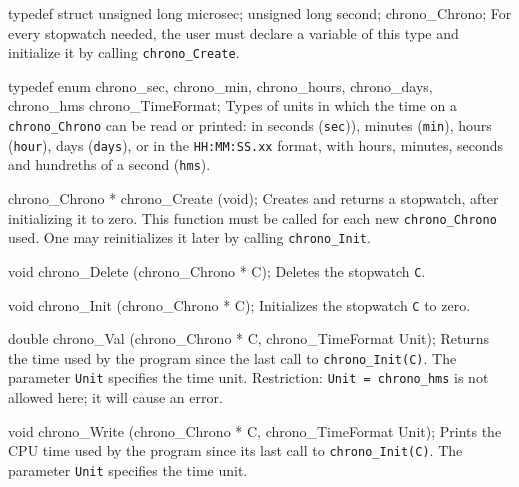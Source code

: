 \code
\iffalse
/* chrono.h for ANSI C */

#ifndef CHRONO_H
#define CHRONO_H 
#include "gdef.h"
\fi
\endcode

\newpage
\code

typedef struct {
   unsigned long microsec;
   unsigned long second;
   } chrono_Chrono;
\endcode
  \tab
   For every stopwatch needed, the user must declare a variable of
   this type and initialize it by calling {\tt chrono\_Create}.
  \endtab
\code


typedef enum {
   chrono_sec,
   chrono_min,
   chrono_hours, 
   chrono_days,
   chrono_hms
   } chrono_TimeFormat;
\endcode
 \tab
  Types of units in which the time on a {\tt chrono\_Chrono} can be 
  read or printed:
  in seconds ({\tt sec})), minutes ({\tt min}), hours ({\tt hour}), days
  ({\tt days}), or in the {\tt HH:MM:SS.xx} format, with hours, 
  minutes, seconds and hundreths of a second ({\tt hms}).
 \endtab


\code

chrono_Chrono * chrono_Create (void);
\endcode
  \tab
   Creates and returns a stopwatch, after initializing it to zero. This
   function must be called for each new {\tt chrono\_Chrono} used.
   One may reinitializes it later by calling {\tt chrono\_Init}.
  \endtab
\code


void chrono_Delete (chrono_Chrono * C);
\endcode
  \tab
   Deletes the stopwatch {\tt C}.
  \endtab
\code


void chrono_Init (chrono_Chrono * C);
\endcode
  \tab
  Initializes the stopwatch {\tt C} to zero.
  \endtab
\code


double chrono_Val (chrono_Chrono * C, chrono_TimeFormat Unit);
\endcode
  \tab
  Returns the time used by the program since the last call to
  {\tt chrono\_Init(C)}. The parameter {\tt Unit} specifies the time unit.
  Restriction: {\tt Unit = chrono\_hms} is not allowed here; 
  it will cause an error.
  \endtab
\code


void chrono_Write (chrono_Chrono * C, chrono_TimeFormat Unit);
\endcode
 \tab
  Prints the CPU time used by the program since its last
  call to {\tt chrono\_Init(C)}.
  The parameter {\tt Unit} specifies the time unit.
 \endtab
\code
\iffalse
#endif
\fi\endcode

